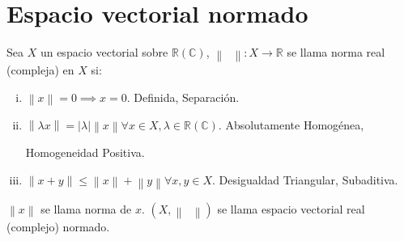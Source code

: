 \chapter{Espacio vectorial normado}
\label{intro} %

\begin{definition}
	Sea $X$ un espacio vectorial sobre
	\begin{math}
		\mathbb{R}
		\left(
		\mathbb{C}
		\right)
	\end{math},
	\begin{math}
		\left\|
		\phantom{\cdot}
		\right\|\colon
		X\to
		\mathbb{R}
	\end{math}
	se llama norma real (compleja) en $X$ si:
	\begin{enumerate}[i)]
		\item

		      \begin{math}
			      \left\|
			      x
			      \right\|=
			      0\implies
			      x=
			      0
		      \end{math}.
		      \hfill
		      Definida, Separación.

		\item

		      \begin{math}
			      \left\|
			      \lambda x
			      \right\|=
			      \left|
			      \lambda
			      \right|
			      \left\|
			      x
			      \right\|
			      \forall x\in X,
			      \lambda\in\mathbb{R}
			      \left(\mathbb{C}\right)
		      \end{math}.
		      \hfill
		      Absolutamente Homogénea,

		      \hfill
		      Homogeneidad Positiva.

		\item

		      \begin{math}
			      \left\|
			      x+y
			      \right\|\leq
			      \left\|
			      x
			      \right\|+
			      \left\|
			      y
			      \right\|
			      \forall x, y\in X
		      \end{math}.
		      \hfill
		      Desigualdad Triangular, Subaditiva.
	\end{enumerate}

	\begin{math}
		\left\|
		x
		\right\|
	\end{math}
	se llama norma de $x$.
	\begin{math}
		\left(
		X,
		\left\|
		\phantom{\cdot}
		\right\|
		\right)
	\end{math}
	se llama espacio vectorial real (complejo) normado.
\end{definition}

